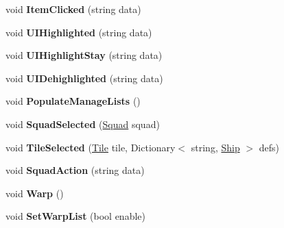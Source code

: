 \begin{DoxyCompactItemize}
\item 
\hypertarget{class_g_u_i_manager_a9cf7216d35d52899666291e2b0cebf9c}{}void {\bfseries Item\+Clicked} (string data)\label{class_g_u_i_manager_a9cf7216d35d52899666291e2b0cebf9c}

\item 
\hypertarget{class_g_u_i_manager_a2be9dd98422a437d0f9273423ad9c6d0}{}void {\bfseries U\+I\+Highlighted} (string data)\label{class_g_u_i_manager_a2be9dd98422a437d0f9273423ad9c6d0}

\item 
\hypertarget{class_g_u_i_manager_ab791f7442e9e0c85fdb50793ca6a6499}{}void {\bfseries U\+I\+Highlight\+Stay} (string data)\label{class_g_u_i_manager_ab791f7442e9e0c85fdb50793ca6a6499}

\item 
\hypertarget{class_g_u_i_manager_a6824d89f72e2ed8e540367ce84ded419}{}void {\bfseries U\+I\+Dehighlighted} (string data)\label{class_g_u_i_manager_a6824d89f72e2ed8e540367ce84ded419}

\item 
\hypertarget{class_g_u_i_manager_ab36ebbcb644a405031f09c98e77cfdd6}{}void {\bfseries Populate\+Manage\+Lists} ()\label{class_g_u_i_manager_ab36ebbcb644a405031f09c98e77cfdd6}

\item 
\hypertarget{class_g_u_i_manager_a4706bf22ccd4bf2c13d3f486a0c2c9ad}{}void {\bfseries Squad\+Selected} (\hyperlink{class_squad}{Squad} squad)\label{class_g_u_i_manager_a4706bf22ccd4bf2c13d3f486a0c2c9ad}

\item 
\hypertarget{class_g_u_i_manager_ac71d733fe0311bbcea79b277b868a7f9}{}void {\bfseries Tile\+Selected} (\hyperlink{class_tile}{Tile} tile, Dictionary$<$ string, \hyperlink{class_ship}{Ship} $>$ defs)\label{class_g_u_i_manager_ac71d733fe0311bbcea79b277b868a7f9}

\item 
\hypertarget{class_g_u_i_manager_a24646bb70428a861111073ac2a7282eb}{}void {\bfseries Squad\+Action} (string data)\label{class_g_u_i_manager_a24646bb70428a861111073ac2a7282eb}

\item 
\hypertarget{class_g_u_i_manager_a00e73a6d99b59f8a6f4b9508b93b7e76}{}void {\bfseries Warp} ()\label{class_g_u_i_manager_a00e73a6d99b59f8a6f4b9508b93b7e76}

\item 
\hypertarget{class_g_u_i_manager_a7f5ea6e99ba16475344ccd09ef6c9a77}{}void {\bfseries Set\+Warp\+List} (bool enable)\label{class_g_u_i_manager_a7f5ea6e99ba16475344ccd09ef6c9a77}


\end{DoxyCompactItemize}
